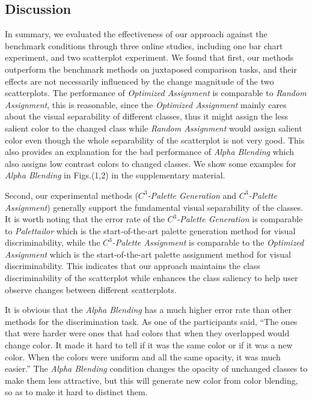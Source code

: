 {\subsection{Discussion}
\label{subsec:discussionEval}
In summary, we evaluated the effectiveness of our approach against the benchmark conditions through three online studies, including one bar chart experiment, and two scatterplot experiment.
We found that first, our methods outperform the benchmark methods on juxtaposed comparison tasks, and their effects are not necessarily influenced by the change magnitude of the two scatterplots.
The performance of \emph{Optimized Assignment} is comparable to \emph{Random Assignment}, this is reasonable, since the \emph{Optimized Assignment} mainly cares about the visual separability of different classes, thus it might assign the less salient color to the changed class while \emph{Random Assignment} would assign salient color even though the whole separability of the scatterplot is not very good. This also provides an explanation for the bad performance of \emph{Alpha Blending} which also assigns low contrast colors to changed classes. We show some examples for \emph{Alpha Blending} in Figs.(1,2) in the supplementary material.

Second, our experimental methods (\emph{$C^3$-Palette Generation} and \emph{$C^3$-Palette Assignment}) generally support the fundamental visual separability of the classes. It is worth noting that the error rate of the \emph{$C^3$-Palette Generation} is comparable to \emph{Palettailor} which is the start-of-the-art palette generation method for visual discriminability, while the \emph{$C^3$-Palette Assignment} is comparable to the \emph{Optimized Assignment} which is the start-of-the-art palette assignment method for visual discriminability. This indicates that our approach maintains the class discriminability of the scatterplot while enhances the class saliency to help user observe changes between different scatterplots.

It is obvious that the \emph{Alpha Blending} has a much higher error rate than other methods for the discrimination task. As one of the participants said, ``The ones that were harder were ones that had colors that when they overlapped would change color. It made it hard to tell if it was the same color or if it was a new color. When the colors were uniform and all the same opacity, it was much easier.'' The \emph{Alpha Blending} condition changes the opacity of unchanged classes to make them less attractive, but this will generate new color from color blending, so as to make it hard to distinct them.


}

